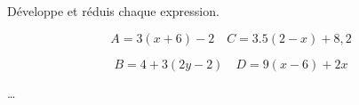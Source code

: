 \begin{exercice*}
    Développe et réduis chaque expression.

    \[A = 3(x + 6) - 2 \quad C = \num{3,5}(2 - x) + 8,2\]

    \[B = 4 + 3(2y - 2) \quad D = 9(x - 6) + 2x\]
\end{exercice*}
\begin{corrige}
    \dots
\end{corrige}

